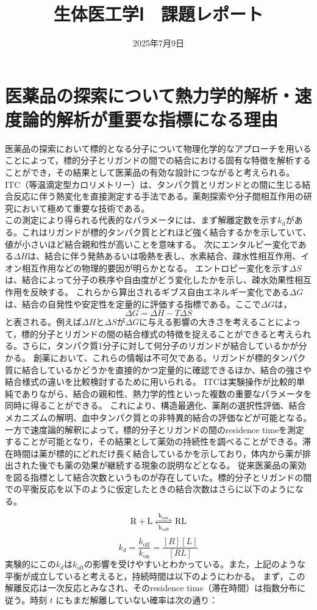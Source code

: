 \documentclass[dvipdfmx, openany,10pt]{jsarticle}
\begin{document}
\title{生体医工学Ⅰ　課題レポート}
\author{}
\date{2025年7月9日}
\maketitle
{\small\section{医薬品の探索について熱力学的解析・速度論的解析が重要な指標になる理由}}
医薬品の探索において標的となる分子について物理化学的なアプローチを用いることによって，標的分子とリガンドの間での結合における固有な特徴を解析することができ，その結果として医薬品の有効な設計につながると考えられる。
ITC（等温滴定型カロリメトリー）は、タンパク質とリガンドとの間に生じる結合反応に伴う熱変化を直接測定する手法である。薬剤探索や分子間相互作用の研究において極めて重要な技術である。\\
この測定により得られる代表的なパラメータには、まず解離定数を示す$k_{\text{d}}$がある。これはリガンドが標的タンパク質とどれほど強く結合するかを示していて、値が小さいほど結合親和性が高いことを意味する。
次にエンタルピー変化である$\Delta H$は、結合に伴う発熱あるいは吸熱を表し、水素結合、疎水性相互作用、イオン相互作用などの物理的要因が明らかとなる。
エントロピー変化を示す$\Delta S$は、結合によって分子の秩序や自由度がどう変化したかを示し、疎水効果性相互作用を反映する。\cite{長門石曉2020医薬品}
これらから算出されるギブス自由エネルギー変化である$\Delta G$は、結合の自発性や安定性を定量的に評価する指標である。ここで$\Delta G$は，
\[ \Delta G = \Delta H - T\Delta S \]
と表される。例えば$\Delta H$と$\Delta S$が$\Delta G$に与える影響の大きさを考えることによって，標的分子とリガンドの間の結合様式の特徴を捉えることができると考えられる。さらに，タンパク質1分子に対して何分子のリガンドが結合しているかが分かる。
創薬において、これらの情報は不可欠である。リガンドが標的タンパク質に結合しているかどうかを直接的かつ定量的に確認できるほか、結合の強さや結合様式の違いを比較検討するために用いられる。
ITCは実験操作が比較的単純でありながら、結合の親和性、熱力学的性といった複数の重要なパラメータを同時に得ることができる。
これにより、構造最適化、薬剤の選択性評価、結合メカニズムの解明、血中タンパク質との非特異的結合の評価などが可能となる。\\
\indent 一方で速度論的解釈によって，標的分子とリガンドの間のresidence timeを測定することが可能となり，その結果として薬効の持続性を調べることができる。滞在時間は薬が標的にどれだけ長く結合しているかを示しており，体内から薬が排出された後でも薬の効果が継続する現象の説明などとなる。
従来医薬品の薬効を図る指標として結合次数というものが存在していた。標的分子とリガンドの間での平衡反応を以下のように仮定したときの結合次数はさらに以下のようになる。\\
\[ \ce{R + L <=>C[k_{\text{on}}][k_{\text{off}}] RL} \]
\[ k_d = \frac{k_{\text{off}}}{k_{\text{on}}} = \frac{[R][L]}{[RL]} \]
実験的にこの$k_d$は$k_{\text{off}}$の影響を受けやすいとわかっている。\cite{copeland2016drug}また，上記のような平衡が成立していると考えると，持続時間は以下のようにわかる。
まず，この解離反応は一次反応とみなされ、そのresidence time（滞在時間）は指数分布に従う。時刻 $t$ にもまだ解離していない確率は次の通り：
\end{document}
